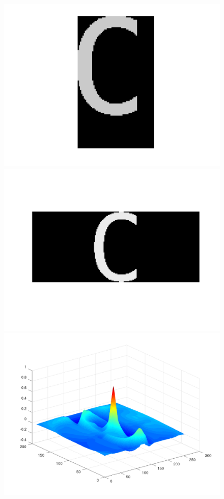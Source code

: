 \documentclass[a4paper,12pt,titlepage]{report}
\begin{document}
	\begin{figure}[h]
		\begin{center}	
			\includegraphics[scale=0.25]{../illus/tuilev.png}
			\includegraphics[scale=0.25]{../illus/2echv.png}
			\includegraphics[scale=0.25]{../illus/2corv.png}
		\end{center}
	\end{figure}
\end{document}
